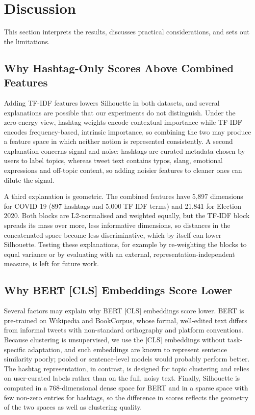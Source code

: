 \documentclass[pdflatex,sn-mathphys-num]{sn-jnl}%
\begin{document}

\section{Discussion}\label{sec6}

This section interprets the results, discusses practical considerations, and sets out the limitations.

\subsection{Why Hashtag-Only Scores Above Combined Features}\label{subsec24}

Adding TF-IDF features lowers Silhouette in both datasets, and several explanations are possible that our experiments do not distinguish. Under the zero-energy view, hashtag weights encode contextual importance while TF-IDF encodes frequency-based, intrinsic importance, so combining the two may produce a feature space in which neither notion is represented consistently. A second explanation concerns signal and noise: hashtags are curated metadata chosen by users to label topics, whereas tweet text contains typos, slang, emotional expressions and off-topic content, so adding noisier features to cleaner ones can dilute the signal.

A third explanation is geometric. The combined features have 5,897 dimensions for COVID-19 (897 hashtags and 5,000 TF-IDF terms) and 21,841 for Election 2020. Both blocks are L2-normalised and weighted equally, but the TF-IDF block spreads its mass over more, less informative dimensions, so distances in the concatenated space become less discriminative, which by itself can lower Silhouette. Testing these explanations, for example by re-weighting the blocks to equal variance or by evaluating with an external, representation-independent measure, is left for future work.

\subsection{Why BERT [CLS] Embeddings Score Lower}\label{subsec25}

Several factors may explain why BERT [CLS] embeddings score lower. BERT is pre-trained on Wikipedia and BookCorpus, whose formal, well-edited text differs from informal tweets with non-standard orthography and platform conventions. Because clustering is unsupervised, we use the [CLS] embeddings without task-specific adaptation, and such embeddings are known to represent sentence similarity poorly; pooled or sentence-level models would probably perform better. The hashtag representation, in contrast, is designed for topic clustering and relies on user-curated labels rather than on the full, noisy text. Finally, Silhouette is computed in a 768-dimensional dense space for BERT and in a sparse space with few non-zero entries for hashtags, so the difference in scores reflects the geometry of the two spaces as well as clustering quality.
\end{document}
